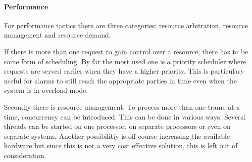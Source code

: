 % 
% 
% 

\paragraph{Performance} 

\npar For performance tactics there are three categories: resource
arbitration, resource management and resource demand.

\npar If there is more than one request to gain control over a resource, there
has to be some form of scheduling. By far the most used one is a priority
scheduler where requests are served earlier when they have a higher priority.
This is particulary useful for alarms to still reach the appropriate parties in
time even when the system is in overload mode. 

\npar Secondly there is resource management. To process more than one trame at a
time, concurrency can be introduced. This can be done in various ways. Several
threads can be started on one processor, on separate processors or even on
separate systems. Another possibilitiy is off course increasing the available
hardware but since this is not a very cost effective solution, this is left out
of consideration.

